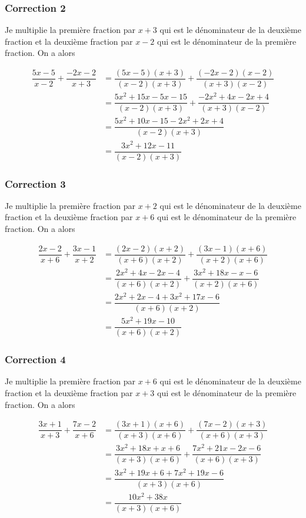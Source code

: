 \documentclass[15pt, mathserif]{beamer}
\begin{document}
\begin{frame}
\vspace{-10mm}
	\frametitle{Correction 2}


\bigskip 

Je multiplie la première fraction par $x+3$ qui est le dénominateur de la deuxième fraction et la deuxième fraction par $x-2$ qui est le dénominateur de la première fraction. On a alors 

 \begin{align*} \dfrac{5x-5}{x-2} + \dfrac{-2x-2}{x+3} &= \dfrac{(5x-5)(x+3)}{(x-2)(x+3)} + \dfrac{(-2x-2)(x-2)}{(x+3)(x-2)}\\ &= \dfrac{5x^2+15x-5x-15}{(x-2)(x+3)}+ \dfrac{-2x^2+4x-2x+4}{(x+3)(x-2)} \\
	&=\dfrac{5x^2+10x-15-2x^2+2x+4}{(x-2)(x+3)}\\
	&=\dfrac{3x^2+12x-11}{(x-2)(x+3)}
\end{align*}\end{frame}


\begin{frame}
\vspace{-10mm}
	\frametitle{Correction 3}


\bigskip 

Je multiplie la première fraction par $x+2$ qui est le dénominateur de la deuxième fraction et la deuxième fraction par $x+6$ qui est le dénominateur de la première fraction. On a alors 

 \begin{align*} \dfrac{2x-2}{x+6} + \dfrac{3x-1}{x+2} &= \dfrac{(2x-2)(x+2)}{(x+6)(x+2)} + \dfrac{(3x-1)(x+6)}{(x+2)(x+6)}\\ &= \dfrac{2x^2+4x-2x-4}{(x+6)(x+2)}+ \dfrac{3x^2+18x-x-6}{(x+2)(x+6)} \\
	&=\dfrac{2x^2+2x-4+3x^2+17x-6}{(x+6)(x+2)}\\
	&=\dfrac{5x^2+19x-10}{(x+6)(x+2)}
\end{align*}\end{frame}


\begin{frame}
\vspace{-10mm}
	\frametitle{Correction 4}


\bigskip 

Je multiplie la première fraction par $x+6$ qui est le dénominateur de la deuxième fraction et la deuxième fraction par $x+3$ qui est le dénominateur de la première fraction. On a alors 

 \begin{align*} \dfrac{3x+1}{x+3} + \dfrac{7x-2}{x+6} &= \dfrac{(3x+1)(x+6)}{(x+3)(x+6)} + \dfrac{(7x-2)(x+3)}{(x+6)(x+3)}\\ &= \dfrac{3x^2+18x+x+6}{(x+3)(x+6)}+ \dfrac{7x^2+21x-2x-6}{(x+6)(x+3)} \\
	&=\dfrac{3x^2+19x+6+7x^2+19x-6}{(x+3)(x+6)}\\
	&=\dfrac{10x^2+38x}{(x+3)(x+6)}
\end{align*}\end{frame}
\end{document}
